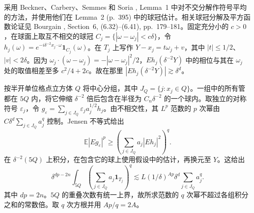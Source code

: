 采用 Beckner、Carbery、Semmes 和 Soria \cite{r-7}, Lemma~1 中对不交分解作符号平均的方法，并使用他们在 Lemma~2 (p.~395) 中的球冠估计。相关球冠分解及平方函数论证见 Bourgain \cite{r-13}, Section~6, (6.32)--(6.41), pp.~179--181。固定充分小的 \(c>0\)，在球面上取互不相交的球冠 \(C_j=\{|\omega-\omega_j|<c\delta\}\)，令 \(h_j(\omega)=e^{-i\delta^{-2}x_j\cdot\omega}\mathbf1_{C_j}(\omega)\)。在 \(T_j\) 上写作 \(Y-x_j=t\omega_j+v\)，其中 \(|t|\le1/2\)、\(|v|<2\delta\)。因为 \(\omega_j\cdot(\omega-\omega_j)=-|\omega-\omega_j|^2/2\)，\(Eh_j(\delta^{-2}Y)\) 中的相位与其在 \(\omega_j\) 处的取值相差至多 \(c^2/4+2c\)。故在那里 \(|Eh_j(\delta^{-2}Y)|\gtrsim\delta^d\)。

按半开单位格点立方体 \(Q\) 将中心分组，其中 \(J_Q=\{j:x_j\in Q\}\)。一组中的所有管都在 \(5Q\) 内，将它伸缩 \(\delta^{-2}\) 倍后包含在半径为 \(C_n\delta^{-2}\) 的一个球内。取独立的对称符号 \(\varepsilon_j\)，令 \(g_\varepsilon=\sum_{j\in J_Q}\varepsilon_j a_j^{1/2}h_j\)。由不相交性，其 \(L^p\) 范数的 \(p\) 次幂由 \(C\delta^d\sum_{j\in J_Q}a_j^q\) 控制。Jensen 不等式给出
\[
 \mathbb E|Eg_\varepsilon|^p\ge
 \left(\sum_{j\in J_Q}a_j|Eh_j|^2\right)^q .
\]
在 \(\delta^{-2}(5Q)\) 上积分，在包含它的球上使用假设中的估计，再换元至 \(Y\)。这给出
\[
 \delta^{dp-2n}\int_{5Q}\left(\sum_{j\in J_Q}a_j\mathbf1_{T_j}\right)^q
 \lesssim L(1/\delta)^{Ap}\delta^d\sum_{j\in J_Q}a_j^q .
\]
其中 \(dp=2n\)。\(5Q\) 的重叠次数有统一上界，故所求范数的 \(q\) 次幂不超过各组积分之和的常数倍。取 \(q\) 次方根并用 \(Ap/q=2A\)。
